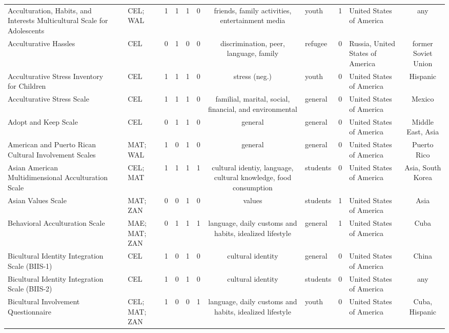 \begin{longtable}[l]{lclclclclclc}
Acculturation, Habits, and Interests Multicultural Scale for Adolescents & \ \citet{Unger2002} & CEL; WAL & 1 & 1 & 1 & 0 & friends, family activities, entertainment media & youth & 1 & United States of America & any\\
Acculturative Hassles & \ \citet{Vinokurov2002} & CEL & 0 & 1 & 0 & 0 & discrimination, peer, language, family & refugee & 0 & Russia, United States of America & former Soviet Union\\
Acculturative Stress Inventory for Children & \ \citet{Suarez-Morales2007} & CEL & 1 & 1 & 1 & 0 & stress (neg.) & youth & 0 & United States of America & Hispanic\\
Acculturative Stress Scale & \ \citet{DeSnyder1987a} & CEL & 1 & 1 & 1 & 0 & familial, marital, social, financial, and environmental & general & 0 & United States of America & Mexico\\
Adopt and Keep Scale & \ \citet{Swaidan2006} & CEL & 0 & 1 & 1 & 0 & general & general & 0 & United States of America & Middle East, Asia\\
American and Puerto Rican Cultural Involvement Scales & \ \citet{Cortes1994} & MAT; WAL & 1 & 0 & 1 & 0 & general & general & 0 & United States of America & Puerto Rico\\
Asian American Multidimensional Acculturation Scale & \ \citet{GimChung2004} & CEL; MAT & 1 & 1 & 1 & 1 & cultural identiy, language, cultural knowledge, food consumption & students & 0 & United States of America & Asia, South Korea\\
Asian Values Scale & \ \citet{Kim1999} & MAT; ZAN & 0 & 0 & 1 & 0 & values & students & 1 & United States of America & Asia\\
Behavioral Acculturation Scale & \ \citet{Szapocznik1978} & MAE; MAT; ZAN & 0 & 1 & 1 & 1 & language, daily customs and habits, idealized lifestyle & general & 1 & United States of America & Cuba\\
Bicultural Identity Integration Scale (BIIS-1) & \ \citet{Benet-Martinez2005} & CEL & 1 & 0 & 1 & 0 & cultural identity & general & 0 & United States of America & China\\
Bicultural Identity Integration Scale (BIIS-2) & \ \citet{Huynh2018} & CEL & 1 & 0 & 1 & 0 & cultural identity & students & 0 & United States of America & any\\
Bicultural Involvement Questionnaire & \ \citet{Szapocznik1980} & CEL; MAT; ZAN & 1 & 0 & 0 & 1 & language, daily customs and habits, idealized lifestyle & youth & 0 & United States of America & Cuba, Hispanic\\

\end{longtable}
